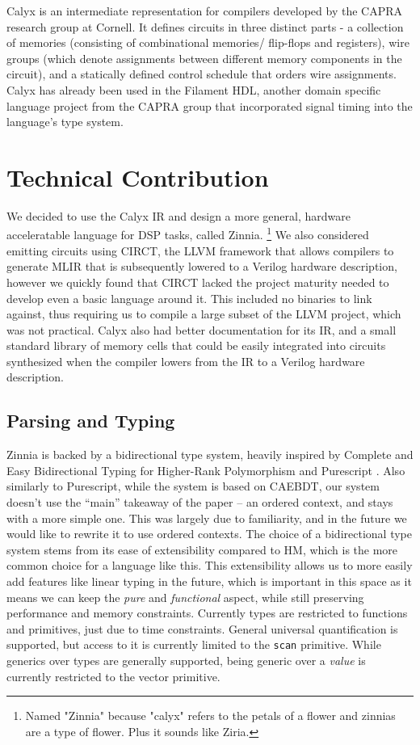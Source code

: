 \documentclass[12pt]{article}
\begin{document}
Calyx \cite{nigam_compiler_2021} is an intermediate representation for compilers developed by the CAPRA research group at Cornell.
It defines circuits in three distinct parts - a collection of memories (consisting of combinational memories/
flip-flops and registers), wire groups (which denote assignments between different memory components
in the circuit), and a statically defined control schedule that orders wire assignments.
Calyx has already been used in the Filament HDL, another domain specific language project from the CAPRA
group that incorporated signal timing into the language's type system.

\section{Technical Contribution}
We decided to use the Calyx IR and design a more general, hardware acceleratable language for DSP tasks, called Zinnia.
\footnote{Named "Zinnia" because "calyx" refers to the petals of a flower and zinnias are a type of flower. Plus it sounds like Ziria.}
We also considered emitting circuits using CIRCT, the LLVM framework that allows compilers to generate
MLIR that is subsequently lowered to a Verilog hardware description, however we quickly found that
CIRCT lacked the project maturity needed to develop even a basic language around it. This included
no binaries to link against, thus requiring us to compile a large subset of the LLVM project, which was not practical.
Calyx also had better documentation for its IR, and a small standard library of memory cells that could be easily integrated
into circuits synthesized when the compiler lowers from the IR to a Verilog hardware description.

\subsection{Parsing and Typing}
Zinnia is backed by a bidirectional type system, heavily inspired by Complete and Easy Bidirectional Typing for Higher-Rank Polymorphism and Purescript \cite{dunfield_complete_2013}. Also similarly to Purescript, while the system is based on CAEBDT, our system doesn't use the ``main'' takeaway of the paper -- an ordered context, and stays with a more simple one. This was largely due to familiarity, and in the future we would like to rewrite it to use ordered contexts. The choice of a bidirectional type system stems from its ease of extensibility compared to HM, which is the more common choice for a language like this. This extensibility allows us to more easily add features like linear typing in the future, which is important in this space as it means we can keep the \textit{pure} and \textit{functional} aspect, while still preserving performance and memory constraints. Currently types are restricted to functions and primitives, just due to time constraints. General universal quantification is supported, but access to it is currently limited to the \texttt{scan} primitive. While generics over types are generally supported, being generic over a \textit{value} is currently restricted to the vector primitive.
\end{document}
